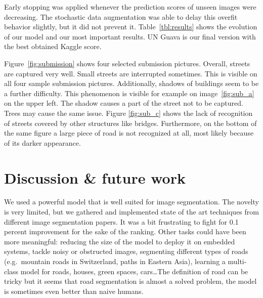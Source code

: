 \documentclass[10pt,conference,compsocconf]{IEEEtran}
\begin{document}
Early stopping was applied whenever the prediction scores of unseen images were decreasing. The stochastic data augmentation was able to delay this overfit behavior slightly, but it did not prevent it. Table~\ref{tbl:results} shows the evolution of our model and our most important results. UN Guava is our final version with the best obtained Kaggle score.

Figure~\ref{fig:submission} shows four selected submission pictures. Overall, streets are captured very well. Small streets are interrupted sometimes. This is visible on all four sample submission pictures. Additionally, shadows of buildings seem to be a further difficulty. This phenomenon is visible for example on image~\ref{fig:sub_a} on the upper left. The shadow causes a part of the street not to be captured. Trees may cause the same issue. Figure \ref{fig:sub_c} shows the lack of recognition of streets covered by other structures like bridges. Furthermore, on the bottom of the same figure a large piece of road is not recognized at all, most likely because of its darker appearance.

\section{Discussion \& future work}\label{sec:discussion}

We used a powerful model that is well suited for image segmentation. The novelty is very limited, but we gathered and implemented state of the art techniques from different image segmentation papers. It was a bit frustrating to fight for 0.1 percent improvement for the sake of the ranking. Other tasks could have been more meaningful: reducing the size of the model to deploy it on embedded systems, tackle noisy or obstructed images, segmenting different types of roads (e.g.\ mountain roads in Switzerland, paths in Eastern Asia), learning a multi-class model for roads, houses, green spaces, cars\ldots The definition of road can be tricky but it seems that road segmentation is almost a solved problem, the model is sometimes even better than naive humans.



\end{document}
